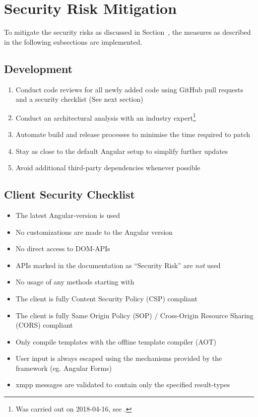 \section{Security Risk Mitigation}\label{sec:security-risk-mitigation}

To mitigate the security risks as discussed in Section~, the measures as described in the following subsections are implemented.

\subsection{Development}

\begin{enumerate}
    \item Conduct code reviews for all newly added code using GitHub pull requests and a security checklist (See next section)
    \item Conduct an architectural analysis with an industry expert\footnote{Was carried out on 2018-04-16, see .}
    \item Automate build and release processes to minimise the time required to patch
    \item Stay as close to the default Angular setup to simplify further updates
    \item Avoid additional third-party dependencies whenever possible
\end{enumerate}

\subsection{Client Security Checklist}
\begin{itemize}
    \item The latest Angular-version is used
    \item No customizations are made to the Angular version
    \item No direct access to DOM-APIs
    \item APIs marked in the documentation as ``Security Risk'' are \emph{not} used
    \item No usage of any methods starting with 
    \item The client is fully Content Security Policy (CSP) compliant
    \item The client is fully Same Origin Policy (SOP) / Cross-Origin Resource Sharing (CORS) compliant
    \item Only compile templates with the offline template compiler (AOT)
    \item User input is always escaped using the mechanisms provided by the framework (eg. Angular Forms)
    \item \gls{xmpp} messages are validated to contain only the specified result-types
\end{itemize}


